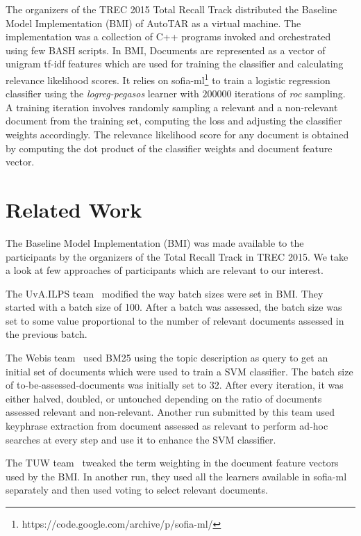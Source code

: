The organizers of the TREC 2015 Total Recall Track distributed the Baseline
Model Implementation (BMI) of AutoTAR as a virtual machine. The implementation
was a collection of C++ programs invoked and orchestrated using few BASH
scripts.  In BMI, Documents are represented as a vector of unigram tf-idf
features which are used for training the classifier and calculating relevance
likelihood scores. It relies on
sofia-ml\footnote{https://code.google.com/archive/p/sofia-ml/}
\cite{sculley2010combined} to train a logistic regression classifier using the
\textit{logreg-pegasos} learner with $200000$ iterations of \textit{roc}
sampling. A training iteration involves randomly sampling a relevant and a
non-relevant document from the training set, computing the loss and adjusting
the classifier weights accordingly. The relevance likelihood score for any
document is obtained by computing the dot product of the classifier weights and
document feature vector.

\section{Related Work}

The Baseline Model Implementation (BMI) was made available to the participants
by the organizers of the Total Recall Track in TREC 2015. We take a look at few
approaches of participants which are relevant to our interest.

The UvA.ILPS team~\cite{van2015university} modified the way batch sizes were
set in BMI. They started with a batch size of 100. After a batch was assessed, the
batch size was set to some value proportional to the number of relevant
documents assessed in the previous batch.

The Webis team~\cite{hagen2015webis} used BM25 using the topic description as query to get an
initial set of documents which were used to train a SVM classifier. The batch size of
to-be-assessed-documents was initially set to 32. After every iteration, it was
either halved, doubled, or untouched depending on the ratio of documents
assessed relevant and non-relevant. Another run submitted by this team used
keyphrase extraction from document assessed as relevant to perform ad-hoc
searches at every step and use it to enhance the SVM classifier.

The TUW team~\cite{lupu2015tuw} tweaked the term weighting in the document feature vectors
used by the BMI. In another run, they used all the learners available in
sofia-ml separately and then used voting to select relevant documents.


